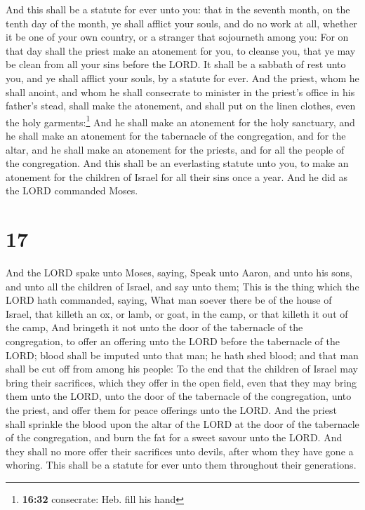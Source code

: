  And this shall be a statute for ever unto you: that in
the seventh month, on the tenth day of the month, ye shall afflict your
souls, and do no work at all, whether it be one of your own country, or
a stranger that sojourneth among you:  For on that day
shall the priest make an atonement for you, to cleanse you, that ye may
be clean from all your sins before the LORD.  It shall be
a sabbath of rest unto you, and ye shall afflict your souls, by a
statute for ever.  And the priest, whom he shall anoint,
and whom he shall consecrate to minister in the priest's office in his
father's stead, shall make the atonement, and shall put on the linen
clothes, even the holy garments:\footnote{\textbf{16:32} consecrate:
  Heb. fill his hand}  And he shall make an atonement for
the holy sanctuary, and he shall make an atonement for the tabernacle of
the congregation, and for the altar, and he shall make an atonement for
the priests, and for all the people of the congregation. 
And this shall be an everlasting statute unto you, to make an atonement
for the children of Israel for all their sins once a year. And he did as
the LORD commanded Moses.

\hypertarget{section-16}{%
\section{17}\label{section-16}}

 And the LORD spake unto Moses, saying, 
Speak unto Aaron, and unto his sons, and unto all the children of
Israel, and say unto them; This is the thing which the LORD hath
commanded, saying,  What man soever there be of the house
of Israel, that killeth an ox, or lamb, or goat, in the camp, or that
killeth it out of the camp,  And bringeth it not unto the
door of the tabernacle of the congregation, to offer an offering unto
the LORD before the tabernacle of the LORD; blood shall be imputed unto
that man; he hath shed blood; and that man shall be cut off from among
his people:  To the end that the children of Israel may
bring their sacrifices, which they offer in the open field, even that
they may bring them unto the LORD, unto the door of the tabernacle of
the congregation, unto the priest, and offer them for peace offerings
unto the LORD.  And the priest shall sprinkle the blood
upon the altar of the LORD at the door of the tabernacle of the
congregation, and burn the fat for a sweet savour unto the LORD.
 And they shall no more offer their sacrifices unto
devils, after whom they have gone a whoring. This shall be a statute for
ever unto them throughout their generations.


